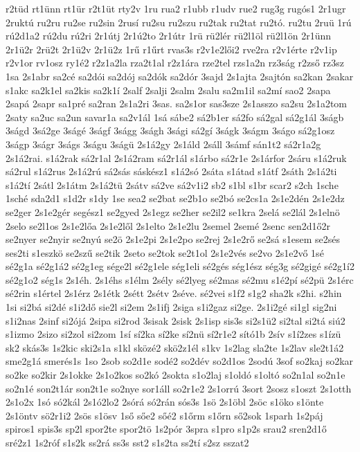 {r2tüd
rt1ünn
rt1ür
r2t1üt
rty2v
1ru
rua2
r1ubb
r1udv
rue2
rug3g
rugós1
2r1ugr
2ruktú
ru2ru
ru2se
ru2sin
2rusí
ru2su
ru2szu
ru2tak
ru2tat
ru2tó.
ru2tu
2ruü
1rú
rú2d1a2
rú2du
rú2ri
2r1útj
2r1ú2to
2r1útr
1rü
rü2lér
rü2l1öl
rü2l1ön
2r1ünn
2r1ü2r
2rü2t
2r1ü2v
2r1ü2z
1rű
r1űrt
rvas3s
r2v1e2lői2
rve2ra
r2v1érte
r2v1ip
r2v1or
rv1osz
ry1é2
r2z1a2la
rza2t1al
r2z1ára
rze2tel
rzs1a2n
rz3ság
r2zső
rz3sz
1sa
2s1abr
sa2cé
sa2dói
sa2dój
sa2dók
sa2dór
3sajd
2s1ajta
2sajtón
sa2kan
2sakar
s1akc
sa2k1el
sa2kis
sa2k1í
2salf
2salji
2salm
2salu
sa2m1il
sa2mí
sao2
2sapa
2sapá
2sapr
sa1pré
sa2ran
2s1a2ri
3sas.
sa2s1or
sas3sze
2s1asszo
sa2su
2s1a2tom
2saty
sa2uc
sa2un
savar1a
sa2v1ál
1sá
sábe2
sá2b1er
sá2fo
sá2gal
sá2g1ál
3ságb
3ságd
3sá2ge
3ságé
3ságf
3ságg
3ságh
3sági
sá2gí
3ságk
3ságm
3ságo
sá2g1osz
3ságp
3ságr
3ságs
3ságu
3ságü
2s1á2gy
2s1áld
2sáll
3sámf
sán1t2
sá2r1a2g
2s1á2rai.
s1á2rak
sá2r1al
2s1á2ram
sá2r1ál
s1árbo
sá2r1e
2s1árfor
2sáru
s1á2ruk
sá2rul
s1á2rus
2s1á2rú
sá2sás
sáskész1
s1á2só
2sáta
s1átad
s1átf
2sáth
2s1á2ti
s1á2tí
2sátl
2s1átm
2s1á2tü
2sátv
sá2ve
sá2v1i2
sb2
s1bl
s1br
scar2
s2ch
1sche
1sché
sda2d1
s1d2r
s1dy
1se
sea2
se2bat
se2b1o
se2bó
se2cs1a
2s1e2dén
2s1e2dz
se2ger
2s1e2gér
segész1
se2gyed
2s1egz
se2her
se2il2
se1kra
2selá
se2lál
2s1elnö
2selo
se2l1os
2s1e2lőa
2s1e2lől
2s1elto
2s1e2lu
2semel
2semé
2senc
sen2d1ő2r
se2nyer
se2nyir
se2nyú
se2ö
2s1e2pi
2s1e2po
se2rej
2s1e2rő
se2sá
s1esem
se2sés
ses2ti
s1eszkö
se2szű
se2tik
2seto
se2tok
se2t1ol
2s1e2vés
se2vo
2s1e2vő
1sé
sé2g1a
sé2g1á2
sé2g1eg
sége2l
sé2g1ele
ség1eli
sé2gés
ség1ész
ség3g
sé2gigé
sé2g1í2
sé2g1o2
ség1s
2s1éh.
2s1éhs
s1élm
2sély
sé2lyeg
sé2mas
sé2mu
s1é2pí
sé2pü
2s1érc
sé2rin
s1értel
2s1érz
2s1étk
2sétt
2sétv
2séve.
sé2vei
s1f2
s1g2
sha2k
s2hi.
s2hin
1si
si2bá
si2dé
s1i2dő
sie2l
si2em
2s1ifj
2siga
s1i2gaz
si2ge.
2s1i2gé
si1gl
sig2ni
s1i2nas
2sinf
si2ójá
2sipa
si2rod
3sisak
2sisk
2s1isp
sis3s
si2s1ü2
si2tal
si2tá
siú2
s1izmo
2sizo
si2zol
si2zom
1sí
sí2ka
sí2ke
sí2nü
sí2r1e2
sító1b
2sív
s1í2zes
s1ízü
sk2
skás3s
1s2kic
ski2s1a
s1kl
sközé2
skö2z1él
s1kv
1s2lag
sla2te
1s2lav
sle2t1á2
sme2g1á
smerés1s
1so
2sob
so2d1e
sodé2
so2dév
so2d1os
2sodú
3sof
so2kaj
so2kar
so2ke
so2kir
2s1okke
2s1o2kos
so2kó
2sokta
s1o2laj
s1oldó
s1oltó
so2n1al
so2n1e
so2n1é
son2t1ár
son2t1e
so2nye
sor1áll
so2r1e2
2s1orrú
3sort
2sosz
s1oszt
2s1otth
2s1o2x
1só
só2kál
2s1ó2lo2
2sórá
só2rán
sós3s
1sö
2s1öbl
2söc
s1öko
s1önte
2s1öntv
sö2r1i2
2sös
s1ösv
1ső
sőe2
sőé2
s1őrm
s1őrn
ső2sok
1sparh
1s2páj
spiros1
spis3s
sp2l
spor2te
spor2tö
1s2pór
3spra
s1pro
s1p2s
srau2
sren2d1ő
sré2z1
1s2róf
s1s2k
ss2rá
ss3s
sst2
s1s2ta
ss2tí
s2sz
sszat2
}
